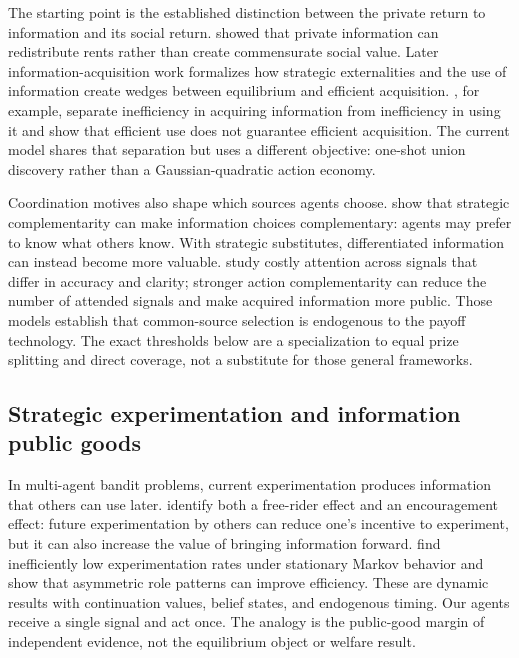 \documentclass[11pt]{article}
\begin{document}
The starting point is the established distinction between the private return to
information and its social return. \citet{Hirshleifer1971} showed that private
information can redistribute rents rather than create commensurate social
value. Later information-acquisition work formalizes how strategic externalities
and the use of information create wedges between equilibrium and efficient
acquisition. \citet{ColomboFemminisPavan2014}, for example, separate
inefficiency in acquiring information from inefficiency in using it and show
that efficient use does not guarantee efficient acquisition. The current model
shares that separation but uses a different objective: one-shot union discovery
rather than a Gaussian-quadratic action economy.

Coordination motives also shape which sources agents choose.
\citet{HellwigVeldkamp2009} show that strategic complementarity can make
information choices complementary: agents may prefer to know what others know.
With strategic substitutes, differentiated information can instead become more
valuable. \citet{MyattWallace2012} study costly attention across signals that
differ in accuracy and clarity; stronger action complementarity can reduce the
number of attended signals and make acquired information more public. Those
models establish that common-source selection is endogenous to the payoff
technology. The exact thresholds below are a specialization to equal prize
splitting and direct coverage, not a substitute for those general frameworks.

\subsection{Strategic experimentation and information public goods}

In multi-agent bandit problems, current experimentation produces information
that others can use later. \citet{BoltonHarris1999} identify both a free-rider
effect and an encouragement effect: future experimentation by others can reduce
one's incentive to experiment, but it can also increase the value of bringing
information forward. \citet{KellerRadyCripps2005} find inefficiently low
experimentation rates under stationary Markov behavior and show that asymmetric
role patterns can improve efficiency. These are dynamic results with
continuation values, belief states, and endogenous timing. Our agents receive a
single signal and act once. The analogy is the public-good margin of independent
evidence, not the equilibrium object or welfare result.
\end{document}
